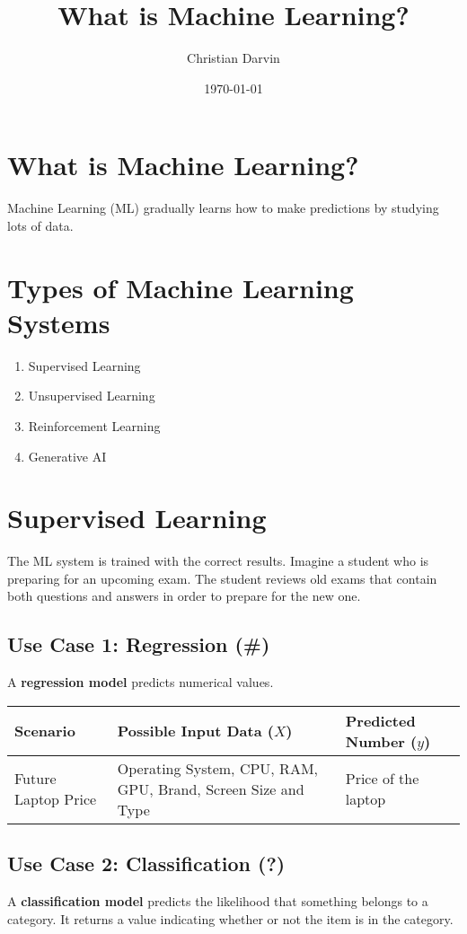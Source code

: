 \documentclass[a4paper,12pt]{article}
\title{What is Machine Learning?}
\author{Christian Darvin}
\date{\today}
\begin{document}
\maketitle

\section*{What is Machine Learning?}
Machine Learning (ML) gradually learns how to make predictions by studying lots of data.

\section*{Types of Machine Learning Systems}
\begin{enumerate}
    \item Supervised Learning
    \item Unsupervised Learning
    \item Reinforcement Learning
    \item Generative AI
\end{enumerate}

\section*{Supervised Learning}
The ML system is trained with the correct results. Imagine a student who is preparing for an upcoming exam. The student reviews old exams that contain both questions and answers in order to prepare for the new one.

\subsection*{Use Case 1: Regression (\#)}
A \textbf{regression model} predicts numerical values.

\begin{center}
\begin{tabularx}{\textwidth}{@{}lXl@{}}
\toprule
Scenario & Possible Input Data ($X$) & Predicted Number ($y$) \\
\midrule
Future Laptop Price & Operating System, CPU, RAM, GPU, Brand, Screen Size and Type & Price of the laptop \\
\bottomrule
\end{tabularx}
\end{center}

\subsection*{Use Case 2: Classification (?)}
A \textbf{classification model} predicts the likelihood that something belongs to a category. It returns a value indicating whether or not the item is in the category.
\end{document}
